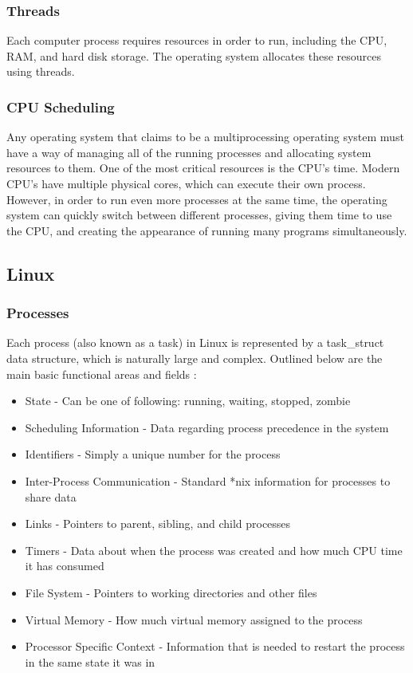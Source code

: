 \documentclass[letterpaper,draftclsnofoot,10pt,onecolumn,titlepage]{IEEEtran}\usepackage[margin=0.75in]{geometry}
\begin{document}
        \subsubsection{Threads}
        Each computer process requires resources in order to run, including the CPU, RAM, and hard disk storage. The
        operating system allocates these resources using threads.

        \subsubsection{CPU Scheduling}
        Any operating system that claims to be a multiprocessing operating system must have a way of managing all of
        the running processes and allocating system resources to them. One of the most critical resources is the CPU's
        time. Modern CPU's have multiple physical cores, which can execute their own process. However, in order to run
        even more processes at the same time, the operating system can quickly switch between different processes, giving
        them time to use the CPU, and creating the appearance of running many programs simultaneously.

    \subsection{Linux}
        \subsubsection{Processes}
        Each process (also known as a task) in Linux is represented by a task\_struct data structure, which is naturally
        large and complex. Outlined below are the main basic functional areas and fields \cite{linuxprocesses}:

        \begin{itemize}
            \item State - Can be one of following: running, waiting, stopped, zombie
            \item Scheduling Information - Data regarding process precedence in the system
            \item Identifiers - Simply a unique number for the process
            \item Inter-Process Communication - Standard *nix information for processes to share data
            \item Links - Pointers to parent, sibling, and child processes
            \item Timers - Data about when the process was created and how much CPU time it has consumed
            \item File System - Pointers to working directories and other files
            \item Virtual Memory - How much virtual memory assigned to the process
            \item Processor Specific Context - Information that is needed to restart the process in the same state it was in
        \end{itemize}
\end{document}
